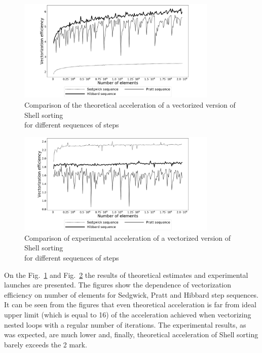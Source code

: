 \documentclass[
11pt,%
tightenlines,%
twoside,%
onecolumn,%
nofloats,%
nobibnotes,%
nofootinbib,%
superscriptaddress,%
noshowpacs,%
centertags]%
{revtex4}
\begin{document}
\begin{figure}[h]
\setcaptionmargin{5mm}
\onelinecaptionsfalse
\includegraphics[width=0.85\textwidth]{pics/experimental_eff.pdf}
\caption{Comparison of the theoretical acceleration of a vectorized version of Shell sorting \\ for different sequences of steps}\label{fig:theor_accel}
\end{figure}

\begin{figure}[h]
\setcaptionmargin{5mm}
\onelinecaptionsfalse
\includegraphics[width=0.85\textwidth]{pics/theoretical_eff.pdf}
\caption{Comparison of experimental acceleration of a vectorized version of Shell sorting \\ for different sequences of steps}\label{experim_accel}
\end{figure}

On the Fig.~\ref{fig:theor_accel} and Fig.~\ref{experim_accel} the results of theoretical estimates and experimental launches are presented. 
The figures show the dependence of vectorization efficiency on number of elements for Sedgwick, Pratt and Hibbard step sequences. 
It can be seen from the figures that even theoretical acceleration is far from ideal upper limit (which is equal to 16) of the acceleration achieved when vectorizing nested loops with a regular number of iterations.
The experimental results, as was expected, are much lower and, finally, theoretical acceleration of Shell sorting barely exceeds the  2 mark. 
        
\end{document}
